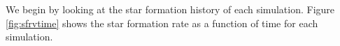 
We begin by looking at the star formation history of each simulation. Figure \ref{fig:sfrvtime} shows the star formation rate as a function of time for each simulation. 


